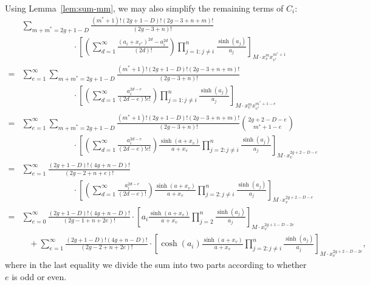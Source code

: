 \documentclass[12pt,reqno]{amsart}
\theoremstyle{plain}
\theoremstyle{definition}
\theoremstyle{remark}
\begin{document}
Using Lemma~\ref{lem:sum-mm}, we may also simplify the remaining terms of $C_i$:
\begin{align*}
  &\sum_{m + m^* = 2g + 1 - D}\frac{(m^* + 1)!(2g + 1 - D)!(2g - 3 + n + m)!}{(2g - 3 + n)!} \\
  & \qquad \qquad \qquad \cdot \left[\left(\sum_{d = 1}^\infty \frac{(a_i + x_{v^*})^{2d} - a_i^{2d}}{(2d)!}\right) \prod_{j=1: j\neq i}^n \frac{\sinh(a_j)}{a_j}\right]_{M \cdot x_v^m x_{v^*}^{m^* + 1}} \\
  =&\sum_{e = 1}^\infty \sum_{m + m^* = 2g + 1 - D}\frac{(m^* + 1)!(2g + 1 - D)!(2g - 3 + n + m)!}{(2g - 3 + n)!} \\
  & \qquad \qquad \qquad \cdot \left[\left(\sum_{d = 1}^\infty \frac{a_i^{2d - e}}{(2d - e)! e!}\right) \prod_{j=1: j\neq i}^n \frac{\sinh(a_j)}{a_j}\right]_{M \cdot x_v^m x_{v^*}^{m^* + 1 - e}} \\
  =&\sum_{e = 1}^\infty \sum_{m + m^* = 2g + 1 - D}\frac{(m^* + 1)!(2g + 1 - D)!(2g - 3 + n + m)!}{(2g - 3 + n)!} \binom{2g + 2 - D - e}{m^* + 1 - e} \\
  & \qquad \qquad \qquad \cdot \left[\left(\sum_{d = 1}^\infty \frac{a_i^{2d - e}}{(2d - e)! e!}\right) \frac{\sinh(a + x_v)}{a + x_v} \prod_{j=2: j\neq i}^n \frac{\sinh(a_j)}{a_j}\right]_{M \cdot x_v^{2g + 2 - D - e}} \\
  =&\sum_{e = 1}^\infty \frac{(2g + 1 - D)! (4g + n - D)!}{(2g - 2 + n + e)!} \\
  & \qquad \qquad \qquad \cdot \left[\left(\sum_{d = 1}^\infty \frac{a_i^{2d - e}}{(2d - e)!}\right) \frac{\sinh(a + x_v)}{a + x_v} \prod_{j=2: j\neq i}^n \frac{\sinh(a_j)}{a_j}\right]_{M \cdot x_v^{2g + 2 - D - e}} \\
  =&\sum_{e = 0}^\infty \frac{(2g + 1 - D)! (4g + n - D)!}{(2g - 1 + n + 2e)!}
  \cdot \left[a_i \frac{\sinh(a + x_v)}{a + x_v} \prod_{j=2}^n \frac{\sinh(a_j)}{a_j}\right]_{M \cdot x_v^{2g + 1 - D - 2e}} 
  \\&\hspace{10pt}+\sum_{e = 1}^\infty \frac{(2g + 1 - D)! (4g + n - D)!}{(2g - 2 + n + 2e)!}
  \cdot \left[\cosh(a_i) \frac{\sinh(a + x_v)}{a + x_v} \prod_{j=2: j\neq i}^n \frac{\sinh(a_j)}{a_j}\right]_{M \cdot x_v^{2g + 2 - D - 2e}},
\end{align*}
where in the last equality we divide the sum into two parts according to whether $e$ is odd or even. 
\end{document}
